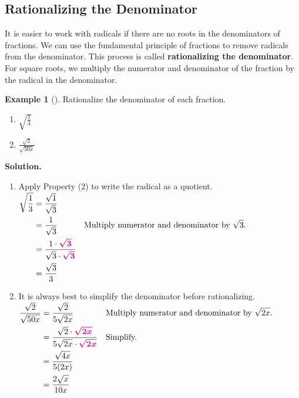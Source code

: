 \documentclass[10pt,]{book}
\newcommand{\terminology}[1]{\textbf{#1}}
\theoremstyle{plain}
\theoremstyle{definition}
\theoremstyle{definition}
\newtheorem{example}[theorem]{Example}
\theoremstyle{definition}
\numberwithin{equation}{part}
\newcommand{\alert}[1]{\boldsymbol{\color{magenta}{#1}}}
\newcommand{\amp}{&}
\begin{document}
\subsection[{Rationalizing the Denominator}]{Rationalizing the Denominator}\label{subsection-47}
It is easier to work with radicals if there are no roots in the denominators of fractions. We can use the fundamental principle of fractions to remove radicals from the denominator. This process is called \terminology{rationalizing the denominator}. For square roots, we multiply the numerator and denominator of the fraction by the radical in the denominator.%
\begin{example}[]\label{example-75}
Rationalize the denominator of each fraction. \leavevmode%
\begin{enumerate}[label=*\alph**]
\item\hypertarget{li-352}{}\(\displaystyle{\sqrt{\frac{1}{3}}}\)%
\item\hypertarget{li-353}{}\(\displaystyle{\frac{\sqrt{2}}{\sqrt{50x}} }\)%
\end{enumerate}
%
\par\medskip\noindent%
\textbf{Solution.}\quad \leavevmode%
\begin{enumerate}[label=*\alph**]
\item\hypertarget{li-354}{}Apply Property (2) to write the radical as a quotient. \(\begin{aligned}
\sqrt{\frac{1}{3}}\amp = \frac{\sqrt{1}}{\sqrt{3}} \\
\amp =\frac{1}{\sqrt{3}}
\amp\amp\text{Multiply numerator and denominator by } \sqrt{3}.\\
\amp = \frac{1\cdot \alert{\sqrt{3}}}{\sqrt{3}\cdot \alert{\sqrt{3}}}\\
\amp = \frac{\sqrt{3}}{3}
\end{aligned}\)%
\item\hypertarget{li-355}{}It is always best to simplify the denominator before rationalizing. \(\begin{aligned}
\frac{\sqrt{2}}{\sqrt{50x}}\amp = \frac{\sqrt{2}}{5\sqrt{2x}} 
\amp\amp\text{Multiply numerator and denominator by } \sqrt{2x}.\\
\amp = \frac{\sqrt{2}\cdot \alert{\sqrt{2x}}}{5\sqrt{2x}\cdot \alert{\sqrt{2x}}}
\amp\amp\text{Simplify.} \\
\amp = \frac{\sqrt{4x}}{5(2x)}\\
\amp =\frac{2\sqrt{x}}{10x}
\end{aligned}\)%
\end{enumerate}
%
\end{example}
\end{document}
